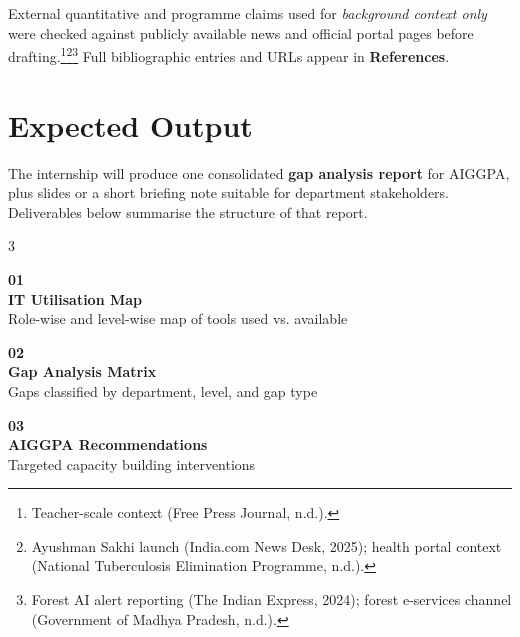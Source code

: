 \documentclass[11pt,a4paper]{article}
\begin{document}
\vspace{0.2cm}
\noindent External quantitative and programme claims used for \textit{background context only} were checked against publicly available news and official portal pages before drafting.\footnote{Teacher-scale context (Free Press Journal, n.d.).}\footnote{Ayushman Sakhi launch (India.com News Desk, 2025); health portal context (National Tuberculosis Elimination Programme, n.d.).}\footnote{Forest AI alert reporting (The Indian Express, 2024); forest e-services channel (Government of Madhya Pradesh, n.d.).} Full bibliographic entries and URLs appear in \textbf{References}.

\section{Expected Output}

\vspace{0.2cm}
\noindent The internship will produce one consolidated \textbf{gap analysis report} for AIGGPA, plus slides or a short briefing note suitable for department stakeholders. Deliverables below summarise the structure of that report.

\vspace{0.25cm}
\begin{multicols}{3}

\begin{tcolorbox}[colback=navyblue,colframe=navyblue,arc=4mm,
  left=8pt,right=8pt,top=8pt,bottom=8pt]
\centering
{\color{gold}\bfseries\large 01}\\[4pt]
{\color{white}\small\textbf{IT Utilisation Map}\\[4pt]
Role-wise and level-wise map of tools used vs. available}
\end{tcolorbox}

\columnbreak

\begin{tcolorbox}[colback=accentteal,colframe=accentteal,arc=4mm,
  left=8pt,right=8pt,top=8pt,bottom=8pt]
\centering
{\color{white}\bfseries\large 02}\\[4pt]
{\color{white}\small\textbf{Gap Analysis Matrix}\\[4pt]
Gaps classified by department, level, and gap type}
\end{tcolorbox}

\columnbreak

\begin{tcolorbox}[colback=gold,colframe=gold,arc=4mm,
  left=8pt,right=8pt,top=8pt,bottom=8pt]
\centering
{\color{navyblue}\bfseries\large 03}\\[4pt]
{\color{navyblue}\small\textbf{AIGGPA Recommendations}\\[4pt]
Targeted capacity building interventions}
\end{tcolorbox}

\end{multicols}
\end{document}
